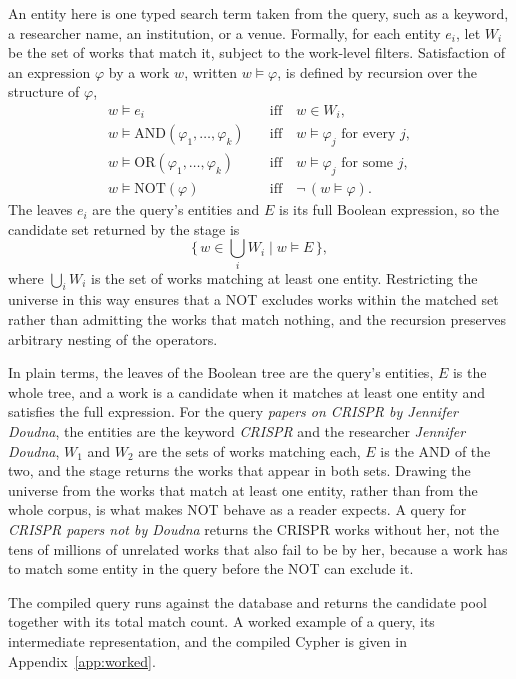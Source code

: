 An entity here is one typed search term taken from the query, such as a keyword, a researcher name, an institution, or a venue. Formally, for each entity $e_{i}$, let $W_{i}$ be the set of works that match it, subject to the work-level filters. Satisfaction of an expression $\varphi$ by a work $w$, written $w \models \varphi$, is defined by recursion over the structure of $\varphi$,
%
\begin{align*}
    w \models e_{i} &\quad\text{iff}\quad w \in W_{i}, \\
    w \models \mathrm{AND}(\varphi_{1}, \ldots, \varphi_{k}) &\quad\text{iff}\quad w \models \varphi_{j} \text{ for every } j, \\
    w \models \mathrm{OR}(\varphi_{1}, \ldots, \varphi_{k}) &\quad\text{iff}\quad w \models \varphi_{j} \text{ for some } j, \\
    w \models \mathrm{NOT}(\varphi) &\quad\text{iff}\quad \lnot\,(w \models \varphi).
\end{align*}
%
The leaves $e_{i}$ are the query's entities and $E$ is its full Boolean expression, so the candidate set returned by the stage is
%
\[
    \{\, w \in \bigcup_{i} W_{i} \mid w \models E \,\},
\]
%
where $\bigcup_{i} W_{i}$ is the set of works matching at least one entity. Restricting the universe in this way ensures that a NOT excludes works within the matched set rather than admitting the works that match nothing, and the recursion preserves arbitrary nesting of the operators.

In plain terms, the leaves of the Boolean tree are the query's entities, $E$ is the whole tree, and a work is a candidate when it matches at least one entity and satisfies the full expression. For the query \emph{papers on CRISPR by Jennifer Doudna}, the entities are the keyword \emph{CRISPR} and the researcher \emph{Jennifer Doudna}, $W_{1}$ and $W_{2}$ are the sets of works matching each, $E$ is the AND of the two, and the stage returns the works that appear in both sets. Drawing the universe from the works that match at least one entity, rather than from the whole corpus, is what makes NOT behave as a reader expects. A query for \emph{CRISPR papers not by Doudna} returns the CRISPR works without her, not the tens of millions of unrelated works that also fail to be by her, because a work has to match some entity in the query before the NOT can exclude it.

The compiled query runs against the database and returns the candidate pool together with its total match count. A worked example of a query, its intermediate representation, and the compiled Cypher is given in Appendix~\ref{app:worked}.

